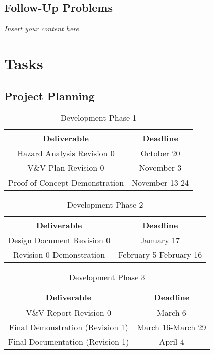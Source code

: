 \documentclass[12pt]{article}
\newcommand{\lips}{\textit{Insert your content here.}}
\begin{document}
\subsection{Follow-Up Problems}
\lips

\section{Tasks}
\subsection{Project Planning}
\begin{table}[H]
  \centering
  \begin{tabular}{ |c|c| } 
  \hline
  \textbf{Deliverable} & \textbf{Deadline} \\ 
  \hline
  Hazard Analysis Revision 0 & October 20 \\
  \hline
  V\&V Plan Revision 0 & November 3 \\ 
  \hline
  Proof of Concept Demonstration & November 13-24 \\ 
  \hline
  \end{tabular}
  \caption{Development Phase 1}
  \label{tab:developmentphase1}
\end{table}

\begin{table}[H]
  \centering
  \begin{tabular}{ |c|c| } 
  \hline
  \textbf{Deliverable} & \textbf{Deadline} \\ 
  \hline
  Design Document Revision 0 & January 17 \\
  \hline
  Revision 0 Demonstration & February 5-February 16 \\ 
  \hline
  \end{tabular}
  \caption{Development Phase 2}
  \label{tab:developmentphase2}
\end{table}

\begin{table}[H]
  \centering
  \begin{tabular}{ |c|c| } 
  \hline
  \textbf{Deliverable} & \textbf{Deadline} \\ 
  \hline
  V\&V Report Revision 0 & March 6 \\ 
  \hline
  Final Demonstration (Revision 1) & March 16-March 29 \\
  \hline
  Final Documentation (Revision 1) & April 4 \\ 
  \hline
  \end{tabular}
  \caption{Development Phase 3}
  \label{tab:developmentphase3}
\end{table}
\end{document}
